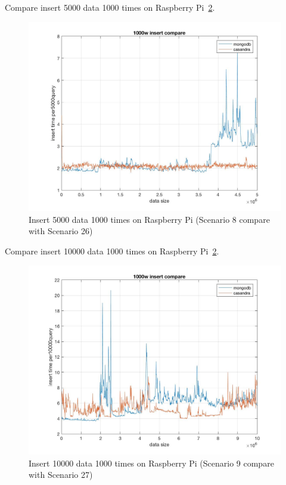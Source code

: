 Compare insert 5000 data 1000 times on Raspberry Pi~\ref{f:fly}.

\begin{figure}[!ht]
  \centering\includegraphics[width=\columnwidth]
  {images/insert_comp_5000_pi.jpg}
  \caption{Insert 5000 data 1000 times on Raspberry Pi
   (Scenario 8 compare with Scenario 26)}\label{f:fly}
\end{figure}

Compare insert 10000 data 1000 times on Raspberry Pi~\ref{f:fly}.

\begin{figure}[!ht]
  \centering\includegraphics[width=\columnwidth]
  {images/insert_comp_10000_pi.jpg}
  \caption{Insert 10000 data 1000 times on Raspberry Pi
   (Scenario 9 compare with Scenario 27)}\label{f:fly}
\end{figure}

